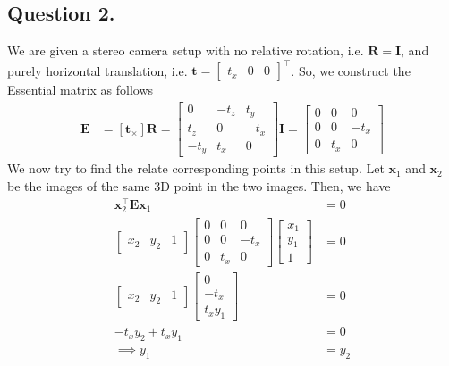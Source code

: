 \documentclass[10pt]{article}
\begin{document}
    \subsection*{\textbf{Question 2.}}
    We are given a stereo camera setup with no relative rotation, i.e.
    $\mathbf{R} = \mathbf{I}$, and purely horizontal translation, i.e.
    $\mathbf{t} = \begin{bmatrix} t_x & 0 & 0 \end{bmatrix}^{\top}$. So,
    we construct the Essential matrix as follows
    \begin{align*}
        \mathbf{E} &= [\mathbf{t}_{\times}] \mathbf{R}
        = \begin{bmatrix}
            0 & -t_{z} & t_{y} \\
            t_{z} & 0 & -t_{x} \\
            -t_{y} & t_{x} & 0
        \end{bmatrix} \mathbf{I}
        = \begin{bmatrix}
            0 & 0 & 0 \\
            0 & 0 & -t_{x} \\
            0 & t_{x} & 0
        \end{bmatrix}
    \end{align*}
    We now try to find the relate corresponding points in this setup. Let
    $\mathbf{x}_{1}$ and $\mathbf{x}_{2}$ be the images of the same 3D point
    in the two images. Then, we have
    \begin{align*}
        \mathbf{x}_{2}^{\top} \mathbf{E} \mathbf{x}_{1} &= 0 \\
        \begin{bmatrix}
            x_{2} & y_{2} & 1
        \end{bmatrix} \begin{bmatrix}
            0 & 0 & 0 \\
            0 & 0 & -t_{x} \\
            0 & t_{x} & 0
        \end{bmatrix} \begin{bmatrix}
            x_{1} \\ y_{1} \\ 1
        \end{bmatrix} &= 0 \\
        \begin{bmatrix}
            x_{2} & y_{2} & 1
        \end{bmatrix} \begin{bmatrix}
            0 \\
            -t_{x} \\
            t_{x} y_{1}
        \end{bmatrix} &= 0 \\
        -t_{x} y_{2} + t_{x} y_{1} &= 0 \\
        \implies y_{1} &= y_{2}
    \end{align*}
\end{document}
